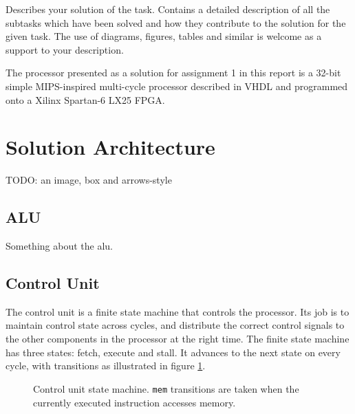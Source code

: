 Describes your solution of the task.
Contains a detailed description of all the subtasks which have been solved and how they contribute to the solution for the given task.
The use of diagrams, figures, tables and similar is welcome as a support to your description.

The processor presented as a solution for assignment 1 in this report is a 32-bit simple MIPS-inspired multi-cycle processor described in VHDL and programmed onto a Xilinx Spartan-6 LX25 FPGA.

\section{Solution Architecture}

TODO: an image, box and arrows-style

\subsection{ALU}

Something about the alu.

\subsection{Control Unit}

The control unit is a finite state machine that controls the processor.
Its job is to maintain control state across cycles, and distribute the correct control signals to the other components in the processor at the right time.
The finite state machine has three states: fetch, execute and stall.
It advances to the next state on every cycle, with transitions as illustrated in figure \ref{figure:control-unit-state-machine}.

\begin{figure}[h]
    \begin{center}
            \caption{
                Control unit state machine.
                \texttt{mem} transitions are taken when the currently executed instruction accesses memory.
            }
            \label{figure:control-unit-state-machine}
    \end{center}
\end{figure}

